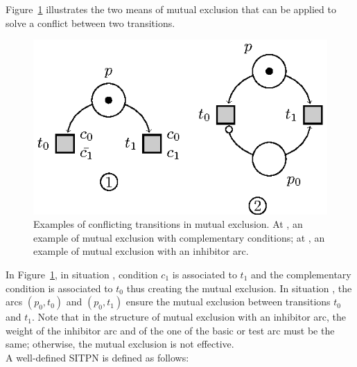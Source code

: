 \documentclass[pdflatex,sn-mathphys]{sn-jnl}%
\theoremstyle{thmstyleone}%
\theoremstyle{thmstyletwo}%
\theoremstyle{thmstylethree}%
\begin{document}
Figure~\ref{fig:mutex} illustrates the two means of mutual exclusion
that can be applied to solve a conflict between two transitions.

\begin{figure}[H]
  \centering
  \includegraphics[keepaspectratio,width=.45\linewidth]{mutex.eps}
  \caption[Examples of conflicting transitions in mutual exclusion.]{
    Examples of conflicting transitions in mutual exclusion. At
    , an example of mutual exclusion with complementary
    conditions; at , an example of mutual exclusion with an
    inhibitor arc.}
  \label{fig:mutex}
\end{figure}

In Figure~\ref{fig:mutex}, in situation , condition $c_1$
is associated to $t_1$ and the complementary condition is associated
to $t_0$ thus creating the mutual exclusion. In situation ,
the arcs $(p_0,t_0)$ and $(p_0,t_1)$ ensure the mutual exclusion
between transitions $t_0$ and $t_1$. Note that in the structure of
mutual exclusion with an inhibitor arc, the weight of the inhibitor
arc and of the one of the basic or test arc must be the same;
otherwise, the mutual exclusion is not effective.\\

\noindent{}A well-defined SITPN is defined as follows:
\end{document}

